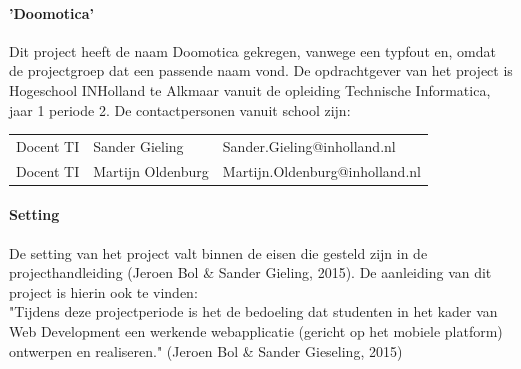 \documentclass[11pt]{article}
\begin{document}
\paragraph{'Doomotica'}
\begin{flushleft}
	Dit project heeft de naam Doomotica gekregen, vanwege een typfout en, omdat de projectgroep dat een passende naam vond. 
	De opdrachtgever van het project is Hogeschool INHolland te Alkmaar vanuit de opleiding Technische Informatica, 
	jaar 1 periode 2. De contactpersonen vanuit school zijn:\\
	\begin{tabular}{l l l}
		Docent TI & Sander Gieling & Sander.Gieling@inholland.nl\\
		Docent TI & Martijn Oldenburg & Martijn.Oldenburg@inholland.nl\\
	\end{tabular}
\end{flushleft}

\paragraph{Setting}
\begin{flushleft}
	De setting van het project valt binnen de eisen die gesteld zijn in de projecthandleiding (Jeroen Bol \& Sander Gieling, 2015). De aanleiding van dit project is hierin ook te vinden: \\
	"Tijdens  deze  projectperiode  is  het  de  bedoeling  dat  studenten  in  het  kader  van
	Web	Development een werkende webapplicatie (gericht op het mobiele platform) ontwerpen
	en  realiseren." (Jeroen Bol \& Sander Gieseling, 2015)
\end{flushleft}
\end{document}

